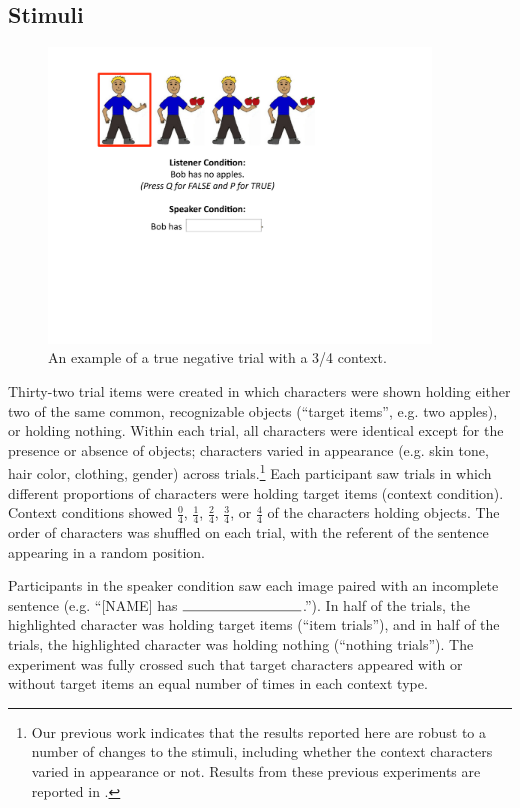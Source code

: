 \documentclass[man, noapacite]{apa2}
\begin{document}
\subsection{Stimuli}

\begin{figure}[t]
\begin{center} 
\includegraphics[width=4in]{figures/trialfig.pdf}
\caption{\label{fig:trial} An example of a true negative trial with a 3/4 context.}
\vspace{-5mm}
\end{center} 
\end{figure}

Thirty-two trial items were created in which characters were shown holding either two of the same common, recognizable objects (``target items'', e.g. two apples), or holding nothing.  Within each trial, all characters were identical except for the presence or absence of objects; characters varied in appearance (e.g. skin tone, hair color, clothing, gender) across trials.\footnote{Our previous work indicates that the results reported here are robust to a number of changes to the stimuli, including whether the context characters varied in appearance or not. Results from these previous experiments are reported in .} Each participant saw trials in which different proportions of characters were holding target items (context condition).  Context conditions showed $\frac{0}{4}$, $\frac{1}{4}$, $\frac{2}{4}$, $\frac{3}{4}$, or $\frac{4}{4}$ of the characters holding objects. The order of characters was shuffled on each trial, with the referent of the sentence appearing in a random position. 

Participants in the speaker condition saw each image paired with an incomplete sentence (e.g. ``[NAME] has $\rule{3cm}{0.15mm}$.''). In half of the trials, the highlighted character was holding target items (``item trials''), and in half of the trials, the highlighted character was holding nothing (``nothing trials'').  The experiment was fully crossed such that target characters appeared with or without target items an equal number of times in each context type.  
\end{document}
